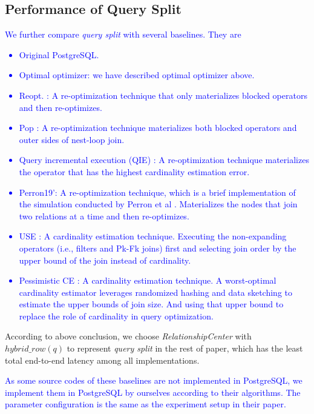 \subsection{Performance of Query Split} \label{S54}
\textcolor{blue}{
    We further compare \textit{query split} with several baselines. They are 
    \begin{itemize}[leftmargin = 15pt]
        \item Original PostgreSQL.
        \item Optimal optimizer: we have described optimal optimizer above.
        \item Reopt. \cite{Reopt}: A re-optimization technique that only materializes blocked operators and then re-optimizes.
        \item Pop \cite{Pop}: A re-optimization technique materializes both blocked operators and outer sides of nest-loop join.
        \item Query incremental execution (QIE) \cite{QIE}: A re-optimization technique materializes the operator that has the highest cardinality estimation error.
        \item Perron19': A re-optimization technique, which is a brief implementation of the simulation conducted by Perron et al \cite{MichaelStonebraker}. Materializes the nodes that join two relations at a time and then re-optimizes.
        \item USE \cite{USE}: A cardinality estimation technique. Executing the non-expanding operators (i.e., filters and Pk-Fk joins) first and selecting join order by the upper bound of the join instead of cardinality.
        \item Pessimistic CE \cite{PessimisticCE}: A cardinality estimation technique. A worst-optimal cardinality estimator leverages randomized hashing and data sketching to estimate the upper bounds of join size. And using that upper bound to replace the role of cardinality in query optimization. 
    \end{itemize}
}\par
    According to above conclusion, we choose \textit{RelationshipCenter} with $hybrid\_row(q)$ to represent \textit{query split} in the rest of paper, which has the least total end-to-end latency among all implementations.\par
\textcolor{blue}{
    As some source codes of these baselines are not implemented in PostgreSQL, we implement them in PostgreSQL by ourselves according to their algorithms. The parameter configuration is the same as the experiment setup in their paper.
}\par
